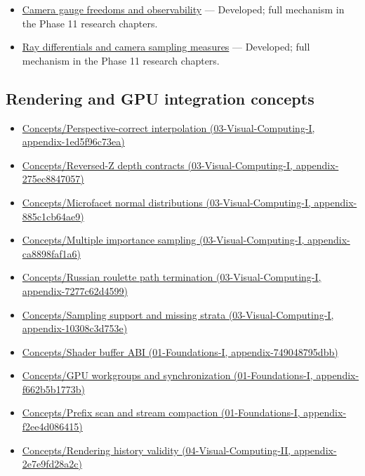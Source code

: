 \begin{itemize}
\tightlist
\item
  \hyperref[appendix-113f0267e5f4]{Camera gauge freedoms and observability} --- Developed; full mechanism in the Phase 11 research chapters.
\item
  \hyperref[appendix-8c40fad29462]{Ray differentials and camera sampling measures} --- Developed; full mechanism in the Phase 11 research chapters.
\end{itemize}

\subsection{Rendering and GPU integration concepts}\label{appendix-a6d556a4ef50-rendering-and-gpu-integration-concepts}

\begin{itemize}
\tightlist
\item
  \href{../03-Visual-Computing-I/main.pdf\#nameddest=appendix-1ed5f96c73ea}{Concepts/Perspective-correct interpolation (03-Visual-Computing-I, appendix-1ed5f96c73ea)}
\item
  \href{../03-Visual-Computing-I/main.pdf\#nameddest=appendix-275ec8847057}{Concepts/Reversed-Z depth contracts (03-Visual-Computing-I, appendix-275ec8847057)}
\item
  \href{../03-Visual-Computing-I/main.pdf\#nameddest=appendix-885c1cb64ae9}{Concepts/Microfacet normal distributions (03-Visual-Computing-I, appendix-885c1cb64ae9)}
\item
  \href{../03-Visual-Computing-I/main.pdf\#nameddest=appendix-ca8898faf1a6}{Concepts/Multiple importance sampling (03-Visual-Computing-I, appendix-ca8898faf1a6)}
\item
  \href{../03-Visual-Computing-I/main.pdf\#nameddest=appendix-7277c62d4599}{Concepts/Russian roulette path termination (03-Visual-Computing-I, appendix-7277c62d4599)}
\item
  \href{../03-Visual-Computing-I/main.pdf\#nameddest=appendix-10308c3d753e}{Concepts/Sampling support and missing strata (03-Visual-Computing-I, appendix-10308c3d753e)}
\item
  \href{../01-Foundations-I/main.pdf\#nameddest=appendix-749048795dbb}{Concepts/Shader buffer ABI (01-Foundations-I, appendix-749048795dbb)}
\item
  \href{../01-Foundations-I/main.pdf\#nameddest=appendix-f662b5b1773b}{Concepts/GPU workgroups and synchronization (01-Foundations-I, appendix-f662b5b1773b)}
\item
  \href{../01-Foundations-I/main.pdf\#nameddest=appendix-f2ee4d086415}{Concepts/Prefix scan and stream compaction (01-Foundations-I, appendix-f2ee4d086415)}
\item
  \href{../04-Visual-Computing-II/main.pdf\#nameddest=appendix-2e7e9fd28a2c}{Concepts/Rendering history validity (04-Visual-Computing-II, appendix-2e7e9fd28a2c)}
\end{itemize}

